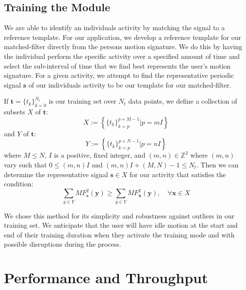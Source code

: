 \documentclass[conference]{IEEEtran}
\begin{document}
\subsection{Training the Module} \label{sec:training}
We are able to identify an individual\textquotesingle s activity by matching the signal to a reference template.
For our application, we develop a reference template for our matched-filter directly from the person\textquotesingle s motion signature.
We do this by having the individual perform the specific activity over a specified amount of time and select the sub-interval of time that we find best represents the user's motion signature.
For a given activity, we attempt to find the representative periodic signal $\textbf{s}$ of our individual\textquotesingle s activity to be our template for our matched-filter.

If $\textbf{t} = \{t_k\}_{k=0}^{N_t}$ is our training set over $N_t$ data points, we define a collection of subsets $X$ of $\textbf{t}$:
%
\begin{equation} \label{eq:X_subsets_of_training_eq}
X := \left \{ \{t_k\}_{k=p}^{p+M-1} | p=mI \right \}
\end{equation}
%
and $Y$ of $\textbf{t}$:
%
\begin{equation} \label{eq:Y_subsets_of_training_eq}
Y := \left \{ \{t_k\}_{k=p}^{p+N-1} | p=nI \right \}
\end{equation}
%
where $M \leq N$, $I$ is a positive, fixed integer, and $(m,n) \in \mathbb{Z}^2$ where $(m,n)$ vary such that $0 \leq (m,n)I$ and $(m,n)I + (M,N) - 1 \leq N_t$. Then we can determine the representative signal $\textbf{s} \in X$ for our activity that satisfies the condition:
%
\begin{equation} \label{eq:s_condition}
\sum_{y \in Y}MF^2_{\textbf{s}}(\textbf{y}) \geq \sum_{y \in Y}MF^2_{\textbf{x}}(\textbf{y}), \quad \forall \textbf{x} \in X
\end{equation}

We chose this method for its simplicity and robustness against outliers in our training set. We anticipate that the user will have idle motion at the start and end of their training duration when they activate the training mode and with possible disruptions during the process.
%
\section{Performance and Throughput}
%
\end{document}
